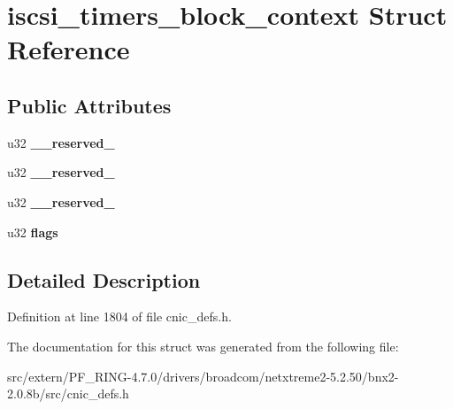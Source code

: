 \hypertarget{structiscsi__timers__block__context}{
\section{iscsi\_\-timers\_\-block\_\-context Struct Reference}
\label{structiscsi__timers__block__context}
}
\subsection*{Public Attributes}
\begin{DoxyCompactItemize}
\item 
\hypertarget{structiscsi__timers__block__context_a56f413bf6551c199e5fb50c0effb4b64}{
u32 {\bfseries \_\-\_\-reserved\_}}
\label{structiscsi__timers__block__context_a56f413bf6551c199e5fb50c0effb4b64}

\item 
\hypertarget{structiscsi__timers__block__context_abfa85215576f6555be55ac9a271ec610}{
u32 {\bfseries \_\-\_\-reserved\_}}
\label{structiscsi__timers__block__context_abfa85215576f6555be55ac9a271ec610}

\item 
\hypertarget{structiscsi__timers__block__context_a35100f11ae9bbcb2214419e0dd404920}{
u32 {\bfseries \_\-\_\-reserved\_}}
\label{structiscsi__timers__block__context_a35100f11ae9bbcb2214419e0dd404920}

\item 
\hypertarget{structiscsi__timers__block__context_a993827c4e9758e5ffbf46d88392c678e}{
u32 {\bfseries flags}}
\label{structiscsi__timers__block__context_a993827c4e9758e5ffbf46d88392c678e}

\end{DoxyCompactItemize}


\subsection{Detailed Description}


Definition at line 1804 of file cnic\_\-defs.h.



The documentation for this struct was generated from the following file:\begin{DoxyCompactItemize}
\item 
src/extern/PF\_\-RING-\/4.7.0/drivers/broadcom/netxtreme2-\/5.2.50/bnx2-\/2.0.8b/src/cnic\_\-defs.h\end{DoxyCompactItemize}
